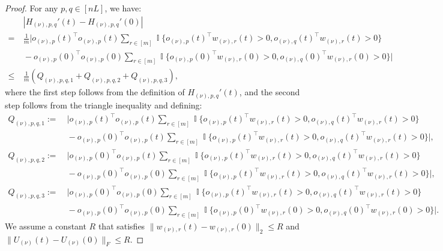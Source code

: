 \documentclass[11pt]{article}
\theoremstyle{plain}
\DeclareMathOperator{\I}{\mathbb{I}}
\begin{document}
\begin{proof}
    For any $p, q \in [nL]$, we have:
    \begin{align*}
        & ~ | H_{(\nu), p, q}'(t) - H_{(\nu), p, q}'(0) | \\
        = & ~ \frac{1}{m}|  o_{(\nu), p}(t)^\top o_{(\nu), p}(t) \sum_{r\in [m]} \I\{ o_{(\nu), p}(t)^\top w_{(\nu), r}(t) > 0,  o_{(\nu), q}(t)^\top w_{(\nu), r}(t) > 0\} \\
        & ~ -  o_{(\nu), p}(0)^\top o_{(\nu), p}(0) \sum_{r\in [m]} \I\{ o_{(\nu), p}(0)^\top w_{(\nu), r}(0) > 0,  o_{(\nu), q}(0)^\top w_{(\nu), r}(0) > 0\} | \\
        \leq & ~ \frac{1}{m} (Q_{(\nu), p, q, 1} + Q_{(\nu), p, q, 2} + Q_{(\nu), p, q, 3}),
    \end{align*}
    where the first step follows from the definition of $H_{(\nu), p, q}'(t)$, and the second step follows from the triangle inequality and defining:
    \begin{align*}
        Q_{(\nu), p, q, 1} := & ~ |  o_{(\nu), p}(t)^\top o_{(\nu), p}(t) \sum_{r\in [m]} \I\{ o_{(\nu), p}(t)^\top w_{(\nu), r}(t) > 0,  o_{(\nu), q}(t)^\top w_{(\nu), r}(t) > 0\} \\
        & ~ -  o_{(\nu), p}(0)^\top o_{(\nu), p}(t) \sum_{r\in [m]} \I\{ o_{(\nu), p}(t)^\top w_{(\nu), r}(t) > 0,  o_{(\nu), q}(t)^\top w_{(\nu), r}(t) > 0\} |, \\
        Q_{(\nu), p, q, 2} := & ~ |  o_{(\nu), p}(0)^\top o_{(\nu), p}(t) \sum_{r\in [m]} \I\{ o_{(\nu), p}(t)^\top w_{(\nu), r}(t) > 0,  o_{(\nu), q}(t)^\top w_{(\nu), r}(t) > 0\} \\
        & ~ -  o_{(\nu), p}(0)^\top o_{(\nu), p}(0) \sum_{r\in [m]} \I\{ o_{(\nu), p}(t)^\top w_{(\nu), r}(t) > 0,  o_{(\nu), q}(t)^\top w_{(\nu), r}(t) > 0\} |, \\
        Q_{(\nu), p, q, 3} := & ~ |  o_{(\nu), p}(0)^\top o_{(\nu), p}(0) \sum_{r\in [m]} \I\{ o_{(\nu), p}(t)^\top w_{(\nu), r}(t) > 0,  o_{(\nu), q}(t)^\top w_{(\nu), r}(t) > 0\} \\
        & ~ -  o_{(\nu), p}(0)^\top o_{(\nu), p}(0) \sum_{r\in [m]} \I\{ o_{(\nu), p}(0)^\top w_{(\nu), r}(0) > 0,  o_{(\nu), q}(0)^\top w_{(\nu), r}(0) > 0\} |.
    \end{align*}
    We assume a constant $R$ that satisfies $\| w_{(\nu), r}(t) - w_{(\nu), r}(0) \|_2 \leq R$ and $\| U_{(\nu)}(t) - U_{(\nu)}(0)\|_F \leq R$.
    

\end{proof}
\end{document}
